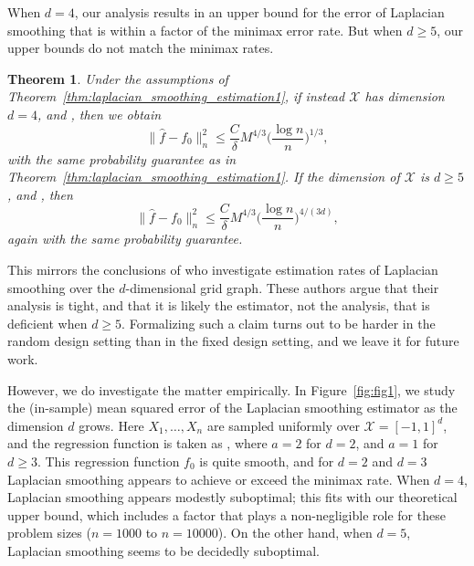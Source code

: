 \documentclass[twoside]{article}
\newcommand{\red}[1]{\textcolor{red}{#1}}
\newcommand{\green}[1]{\textcolor{green}{#1}}
\newcommand{\sbcomment}[1]{{\bf{{\red{{SB --- #1}}}}}}
\newcommand{\agcomment}[1]{{\bf{{\green{{AG --- #1}}}}}}
\newcommand{\1}{\mathbf{1}}
\newcommand{\Xset}{\mathcal{X}}
\newcommand{\wh}[1]{\widehat{#1}}
\newtheorem{theorem}{Theorem}
\theoremstyle{definition}
\theoremstyle{remark}
\begin{document}
When $d = 4$, our analysis results in an upper bound for the error of Laplacian smoothing that is within a  factor of the minimax error rate. But when $d \geq 5$, our upper bounds do not match the minimax rates.
\begin{theorem}
	\label{thm:laplacian_smoothing_estimation2}
	Under the assumptions of Theorem~\ref{thm:laplacian_smoothing_estimation1}, if instead $\Xset$ has dimension $d = 4$,  and , then we obtain 
	\begin{equation*}
	\bigl\|\wh{f} - f_0\bigr\|_n^2 \leq \frac{C}{\delta} M^{4/3} \biggl(\frac{\log n}{n}\biggr)^{1/3},
	\end{equation*}
	with the same probability guarantee as in Theorem~\ref{thm:laplacian_smoothing_estimation1}. If the dimension of $\Xset$ is $d \geq 5$,  and , then
	\begin{equation*}
	\bigl\|\wh{f} - f_0\bigr\|_n^2 \leq \frac{C}{\delta} M^{4/3} \biggl(\frac{\log n}{n}\biggr)^{4/(3d)},
	\end{equation*}
	again with the same probability guarantee.
\end{theorem}
This mirrors the conclusions of \citet{sadhanala16} who investigate estimation rates of Laplacian smoothing over the $d$-dimensional grid graph. These authors argue that their analysis is tight, and that it is likely the estimator, not the analysis, that is deficient when $d \geq 5$. Formalizing such a claim turns out to be harder in the random design setting than in the fixed design setting, and we leave it for future work. 

However, we do investigate the matter empirically. In Figure~\ref{fig:fig1}, we study the (in-sample) mean squared error of the Laplacian smoothing estimator as the dimension $d$ grows. Here $X_1,\ldots,X_n$ are sampled uniformly over $\Xset = [-1,1]^d$, and the regression function is taken as , where $a = 2$ for $d = 2$, and $a = 1$ for $d \geq 3$. This regression function $f_0$ is quite smooth, and for $d = 2$ and $d = 3$ Laplacian smoothing appears to achieve or exceed the minimax rate. When $d = 4$, Laplacian smoothing appears modestly suboptimal; this fits with our theoretical upper bound, which includes a  factor that plays a non-negligible role for these problem sizes ($n=1000$ to $n=10000$). On the other hand, when $d = 5$, Laplacian smoothing seems to be decidedly suboptimal. 
\end{document}
